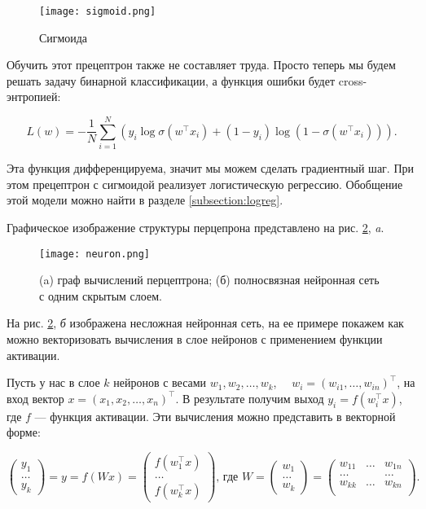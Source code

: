 \begin{figure}[ht]
    \centering
    \texttt{[image: sigmoid.png]}
    \caption{Сигмоида}
    \label{fig:sigmoid}
\end{figure}

Обучить этот прецептрон также не составляет труда. Просто теперь мы будем решать задачу бинарной
классификации, а функция ошибки будет cross-энтропией:

\begin{equation}
 L(w) = -\frac{1}{N}\sum_{i=1}^N(y_i\log\sigma(w^\top x_i) + (1-y_i)\log(1-\sigma(w^\top x_i))).
\end{equation}

Эта функция дифференцируема, значит мы можем сделать градиентный шаг. При этом прецептрон с сигмоидой
реализует логистическую регрессию. Обобщение этой модели можно найти в разделе \ref{subsection:logreg}.

Графическое изображение структуры перцепрона представлено на рис. \ref{fig:neuron}, \textit{a}.

\begin{figure}[ht]
    \centering
    \texttt{[image: neuron.png]}
    \caption{(a) граф вычислений перцептрона; (б) полносвязная нейронная сеть с одним скрытым слоем.}
    \label{fig:neuron}
\end{figure}

На  рис. \ref{fig:neuron}, \textit{б} изображена несложная нейронная сеть, на ее примере покажем как можно
векторизовать вычисления в слое нейронов с применением функции активации.

Пусть у нас в слое $k$ нейронов с весами $w_1, w_2, \ldots, w_k$, $\quad w_i = (w_{i1}, \ldots, w_{in})^\top$,
на вход вектор $x = (x_1, x_2, \ldots, x_n)^\top$. В результате получим выход $y_i = f(w_i^\top x)$, где $f$
--- функция активации. Эти вычисления можно представить в векторной форме:

\begin{equation*}
\begin{pmatrix}
   y_1 \\
   \ldots \\
   y_k
\end{pmatrix} = y = f(Wx) =
\begin{pmatrix}
   f(w_1^\top x)\\
   \ldots \\
   f(w_k^\top x)
\end{pmatrix}\text{, где } W =
\begin{pmatrix}
   w_1 \\
   \ldots \\
   w_k
\end{pmatrix} =
\begin{pmatrix}
   w_{11} & \ldots & w_{1n}\\
   \ldots &  & \ldots\\
   w_{kk} & \ldots & w_{kn}\\
\end{pmatrix}.
\end{equation*}


